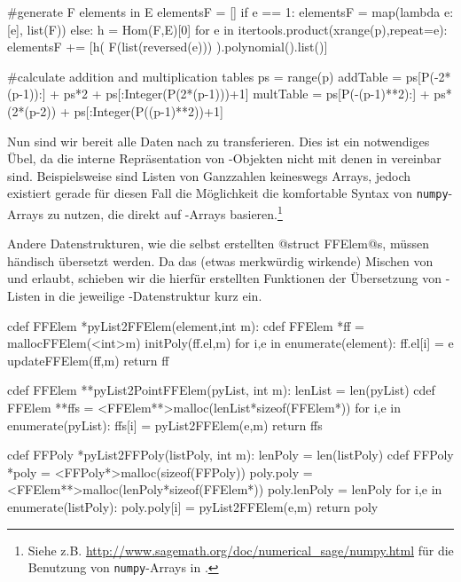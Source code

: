 \begin{sagecode}[caption={\texttt{countCompleteSubmoduleGenerators}
  Fortsetzung (II)}, 
  firstnumber=183]
        #generate F elements in E
    elementsF = []
    if e == 1:
        elementsF = map(lambda e: [e], list(F))
    else:
        h = Hom(F,E)[0]
        for e in itertools.product(xrange(p),repeat=e):
            elementsF += [h( F(list(reversed(e))) ).polynomial().list()]

        #calculate addition and multiplication tables
    ps = range(p)
    addTable = ps[P(-2*(p-1)):] + ps*2 + ps[:Integer(P(2*(p-1)))+1]
    multTable = ps[P(-(p-1)**2):] + ps*(2*(p-2)) + ps[:Integer(P((p-1)**2))+1]
\end{sagecode}  


Nun sind wir bereit alle Daten nach \Clang zu transferieren. Dies ist ein
notwendiges Übel, da die interne Repräsentation von \sage-Objekten nicht mit
denen in \Clang vereinbar sind. Beispielsweise sind Listen von Ganzzahlen
keineswegs Arrays, jedoch existiert gerade für diesen Fall die Möglichkeit 
die komfortable Syntax von \texttt{numpy}-Arrays zu nutzen, die direkt auf 
\Clang-Arrays basieren.\footnote{Siehe z.B.
\url{http://www.sagemath.org/doc/numerical_sage/numpy.html} für die Benutzung
von \texttt{numpy}-Arrays in \sage.}

Andere Datenstrukturen, wie die selbst erstellten @struct FFElem@s, müssen
händisch übersetzt werden. Da \cython das (etwas merkwürdig wirkende) Mischen
von \python und \Clang erlaubt, schieben wir die hierfür erstellten Funktionen
der Übersetzung von \python-Listen in die jeweilige \Clang-Datenstruktur kurz
ein.

\begin{sagecode}[caption={Aus \url{../Sage/enumeratePCNs.spyx}},
  firstnumber=55]
cdef FFElem *pyList2FFElem(element,int m):
    cdef FFElem *ff = mallocFFElem(<int>m)
    initPoly(ff.el,m)
    for i,e in enumerate(element):
        ff.el[i] = e
    updateFFElem(ff,m)
    return ff
\end{sagecode}  

\begin{sagecode}[caption={Aus \url{../Sage/enumeratePCNs.spyx}},
  firstnumber=63]
cdef FFElem **pyList2PointFFElem(pyList, int m):
    lenList = len(pyList)
    cdef FFElem **ffs = <FFElem**>malloc(lenList*sizeof(FFElem*))
    for i,e in enumerate(pyList):
        ffs[i] = pyList2FFElem(e,m)
    return ffs
\end{sagecode}

\begin{sagecode}[caption={Aus \url{../Sage/enumeratePCNs.spyx}},
  firstnumber=70]
cdef FFPoly *pyList2FFPoly(listPoly, int m):
    lenPoly = len(listPoly)
    cdef FFPoly *poly = <FFPoly*>malloc(sizeof(FFPoly))
    poly.poly = <FFElem**>malloc(lenPoly*sizeof(FFElem*))
    poly.lenPoly = lenPoly
    for i,e in enumerate(listPoly):
        poly.poly[i] = pyList2FFElem(e,m)
    return poly
\end{sagecode}


